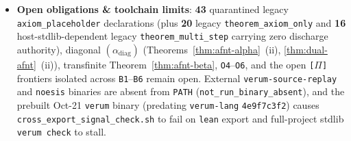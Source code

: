 \documentclass[11pt]{article}
\theoremstyle{plain}
\theoremstyle{definition}
\begin{document}
\begin{itemize}[nosep]
\item \textbf{Open obligations \& toolchain limits}: \textbf{43} quarantined legacy \texttt{axiom\_placeholder} declarations (plus \textbf{20} legacy \texttt{theorem\_axiom\_only} and \textbf{16} host-stdlib-dependent legacy \texttt{theorem\_multi\_step} carrying zero discharge authority), diagonal $(\alpha_{\mathrm{diag}})$ (Theorems~\ref{thm:afnt-alpha}~(ii), \ref{thm:dual-afnt}~(ii)), transfinite Theorem~\ref{thm:afnt-beta}, \texttt{O4}--\texttt{O6}, and the open \texttt{[\textbf{$\Pi$}]} frontiers isolated across \texttt{B1}--\texttt{B6} remain open. External \texttt{verum-source-replay} and \texttt{noesis} binaries are absent from \texttt{PATH} (\texttt{not\_run\_binary\_absent}), and the prebuilt Oct-21 \texttt{verum} binary (predating \texttt{verum-lang} \texttt{4e9f7c3f2}) causes \texttt{cross\_export\_signal\_check.sh} to fail on \texttt{lean} export and full-project stdlib \texttt{verum check} to stall.
\end{itemize}
\end{document}
